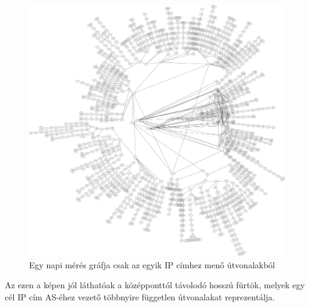 \begin{figure}[!ht]
	\centering
	\includegraphics[width=1\textwidth, keepaspectratio]{figures/graph.png}
	\caption{Egy napi mérés gráfja csak az egyik IP címhez menő útvonalakból\label{fig:graph}}
\end{figure}

Az ezen a képen jól láthatóak a középponttól távolodó hosszú fürtök, melyek egy cél IP cím AS-éhez vezető többnyire független útvonalakat reprezentálja. 